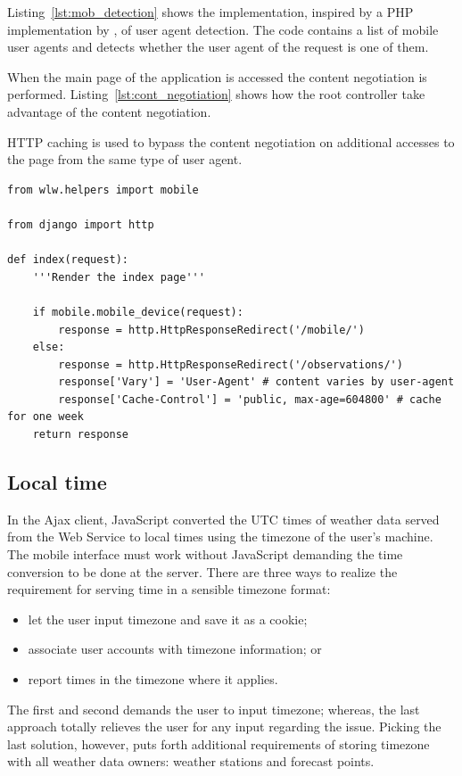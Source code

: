 Listing~\ref{lst:mob_detection} shows the implementation, inspired by a PHP
implementation by \citep{mob:detection}, of user agent detection. The code contains
a list of mobile user agents and detects whether the user agent of the request is
one of them.

When the main page of the application is accessed the content negotiation is
performed. Listing~\ref{lst:cont_negotiation} shows how the root controller take
advantage of the content negotiation.  

HTTP caching is used to bypass the content negotiation on additional accesses to
the page from the same type of user agent.

\begin{lstlisting}[caption=Content negotiating controller,label=lst:cont_negotiation]
from wlw.helpers import mobile

from django import http

def index(request):
    '''Render the index page'''
 
    if mobile.mobile_device(request):
        response = http.HttpResponseRedirect('/mobile/')
    else:
        response = http.HttpResponseRedirect('/observations/')                                      
        response['Vary'] = 'User-Agent' # content varies by user-agent
        response['Cache-Control'] = 'public, max-age=604800' # cache for one week
    return response
\end{lstlisting}

\subsection{Local time}
In the Ajax client, JavaScript converted the UTC times of weather data served from
the Web Service to local times using the timezone of the user's machine. The
mobile interface must work without JavaScript demanding the time conversion to be
done at the server. There are three ways to realize the requirement for serving
time in a sensible timezone format:
\begin{itemize}
  \item let the user input timezone and save it as a cookie;
  \item associate user accounts with timezone information; or
  \item report times in the timezone where it applies.
\end{itemize}
The first and second demands the user to input timezone; whereas, the last
approach totally relieves the user for any input regarding the issue. Picking the
last solution, however, puts forth additional requirements of storing timezone
with all weather data owners: weather stations and forecast points. 

